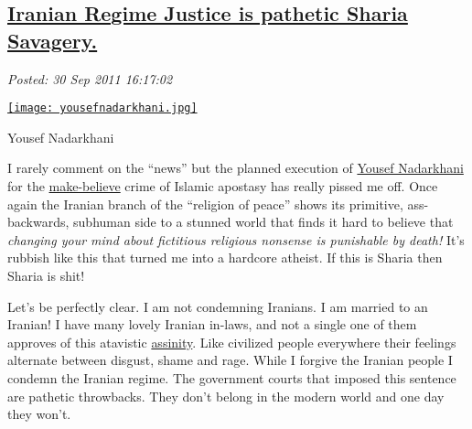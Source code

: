 %

\subsection*{\href{https://bakerjd99.wordpress.com/2011/09/30/iranian-regime-justice-is-pathetic-sharia-savagery/}{Iranian Regime Justice is pathetic Sharia Savagery.}}


\noindent\emph{Posted: 30 Sep 2011 16:17:02}
\vspace{6pt}


\captionsetup[floatingfigure]{labelformat=empty}
\begin{floatingfigure}[l]{0.25\textwidth}
\centering
\href{http://bakerjd99.files.wordpress.com/2011/09/yousefnadarkhani.jpg}{\texttt{[image: yousefnadarkhani.jpg]}}
\caption{Yousef  Nadarkhani}
\label{fig:1952X0}
\end{floatingfigure}I rarely comment on the ``news'' but the planned execution of
\href{http://michellemalkin.com/2011/09/29/iranian-pastor-yousef-nadarkhani-faces-execution-for-refusing-to-renounce-christianity-where-are-the-hollyweirdos-and-euroweenies-now/}{Yousef
Nadarkhani} for
the \href{http://bakerjd99.wordpress.com/2009/10/26/counting-gods/}{make-believe}
crime of Islamic apostasy has really pissed me off. Once again the
Iranian branch of the ``religion of peace'' shows its primitive,
ass-backwards, subhuman side to a stunned world that finds it hard to
believe that \emph{changing your mind about fictitious religious
nonsense is punishable by death!} It's rubbish like this that turned me
into a hardcore atheist. If this is Sharia then Sharia is shit!

Let's be perfectly clear. I am not condemning Iranians. I am married to
an Iranian! I have many lovely Iranian in-laws, and not a single one of
them approves of this atavistic
\href{http://www.urbandictionary.com/define.php?term=Assinity}{assinity}.
Like civilized people everywhere their feelings alternate between
disgust, shame and rage. While I forgive the Iranian people I condemn
the Iranian regime. The government courts that imposed this sentence are
pathetic throwbacks. They don't belong in the modern world and one day
they won't.

